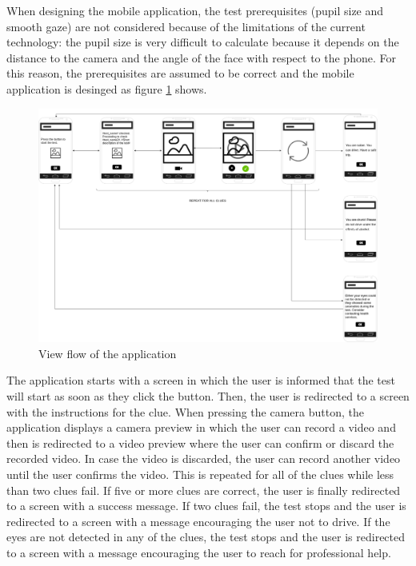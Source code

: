 When designing the mobile application, the test prerequisites (pupil size and smooth gaze) are not considered because of the limitations of the current technology: the pupil size is very difficult to calculate because it depends on the distance to the camera and the angle of the face with respect to the phone. For this reason, the prerequisites are assumed to be correct and the mobile application is desinged as figure \ref{viewflow} shows.

\begin{figure}[H]
    \centering
    \includegraphics[angle=90, width=\textwidth]{./img/viewflow.png}
    \caption{View flow of the application}
    \label{viewflow}
\end{figure}

The application starts with a screen in which the user is informed that the test will start as soon as they click the button. Then, the user is redirected to a screen with the instructions for the clue. When pressing the camera button, the application displays a camera preview in which the user can record a video and then is redirected to a video preview where the user can confirm or discard the recorded video. In case the video is discarded, the user can record another video until the user confirms the video. This is repeated for all of the clues while less than two clues fail. If five or more clues are correct, the user is finally redirected to a screen with a success message. If two clues fail, the test stops and the user is redirected to a screen with a message encouraging the user not to drive. If the eyes are not detected in any of the clues, the test stops and the user is redirected to a screen with a message encouraging the user to reach for professional help.

